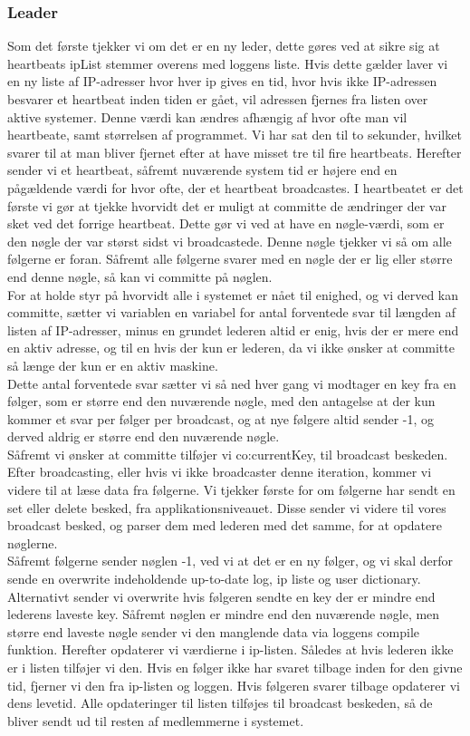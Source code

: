 \documentclass[a4paper,12pt]{article}
\begin{document}
\subsubsection{Leader}
Som det første tjekker vi om det er en ny leder, dette gøres ved at sikre sig at heartbeats ipList stemmer overens med loggens liste. Hvis dette gælder laver vi en ny liste af IP-adresser hvor hver ip gives en tid, hvor hvis ikke IP-adressen besvarer et heartbeat inden tiden er gået, vil adressen fjernes fra listen over aktive systemer. Denne værdi kan ændres afhængig af hvor ofte man vil heartbeate, samt størrelsen af programmet. Vi har sat den til to sekunder, hvilket svarer til at man bliver fjernet efter at have misset tre til fire heartbeats. 
Herefter sender vi et heartbeat, såfremt nuværende system tid er højere end en pågældende værdi for hvor ofte, der et heartbeat broadcastes. I heartbeatet er det første vi gør at tjekke hvorvidt det er muligt at committe de ændringer der var sket ved det forrige heartbeat. Dette gør vi ved at have en nøgle-værdi, som er den nøgle der var størst sidst vi broadcastede. Denne nøgle tjekker vi så om alle følgerne er foran. Såfremt alle følgerne svarer med en nøgle der er lig eller større end denne nøgle, så kan vi committe på nøglen.
\\
For at holde styr på hvorvidt alle i systemet er nået til enighed, og vi derved kan committe, sætter vi variablen en variabel for antal forventede svar til længden af listen af IP-adresser, minus en grundet lederen altid er enig, hvis der er mere end en aktiv adresse, og til en  hvis der kun er lederen, da vi ikke ønsker at committe så længe der kun er en aktiv maskine.
\\[5px]
Dette antal forventede svar sætter vi så ned hver gang vi modtager en key fra en følger, som er større end den nuværende nøgle, med den antagelse at der kun kommer et svar per følger per broadcast, og at nye følgere altid sender -1, og derved aldrig er større end den nuværende nøgle.
\\
Såfremt vi ønsker at committe tilføjer vi co:currentKey, til broadcast beskeden.
Efter broadcasting, eller hvis vi ikke broadcaster denne iteration, kommer vi videre til at læse data fra følgerne. Vi tjekker første for om følgerne har sendt en set eller delete besked, fra applikationsniveauet. Disse sender vi videre til vores broadcast besked, og parser dem med lederen med det samme, for at opdatere nøglerne.
\\
Såfremt følgerne sender nøglen -1, ved vi at det er en ny følger, og vi skal derfor sende en overwrite indeholdende up-to-date log, ip liste og user dictionary. Alternativt sender vi overwrite hvis følgeren sendte en key der er mindre end lederens laveste key.
Såfremt nøglen er mindre end den nuværende nøgle, men større end laveste nøgle sender vi den manglende data via loggens compile funktion.
Herefter opdaterer vi værdierne i ip-listen. Således at hvis lederen ikke er i listen tilføjer vi den. Hvis en følger ikke har svaret tilbage inden for den givne tid, fjerner vi den fra ip-listen og loggen. Hvis følgeren svarer tilbage opdaterer vi dens levetid. 
Alle opdateringer til listen tilføjes til broadcast beskeden, så de bliver sendt ud til resten af medlemmerne i systemet.
\end{document}

